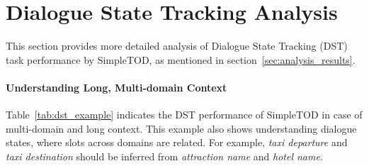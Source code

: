 \documentclass{article}
\begin{document}
\newpage






\section{Dialogue State Tracking Analysis}
\label{appendix:dst_analysis}


This section provides more detailed analysis of Dialogue State Tracking (DST) task performance by SimpleTOD, as mentioned in section~\ref{sec:analysis_results}. 

\paragraph{Understanding Long, Multi-domain Context} Table~\ref{tab:dst_example} indicates the DST performance of SimpleTOD in case of multi-domain and long context. This example also shows understanding dialogue states, where slots across domains are related. For example, \textit{taxi departure} and \textit{taxi destination} should be inferred from \textit{attraction name} and \textit{hotel name}.
\end{document}
